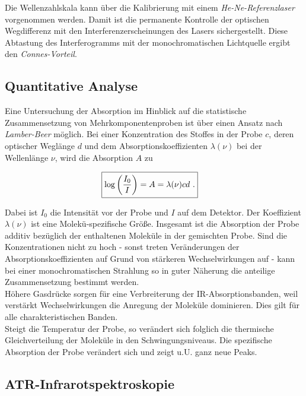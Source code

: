 \documentclass[a4paper,10pt,twocolumn]{article}
\newcommand{\ix}[1]{_\text{#1}}
\newcommand{\tilt}[1]{\textit{#1}}
\begin{document}
		Die Wellenzahlskala kann \"uber die Kalibrierung mit einem \tilt{He-Ne-Referenzlaser} vorgenommen werden. Damit ist die permanente Kontrolle der optischen Wegdifferenz mit den Interferenzerscheinungen des Lasers sichergestellt. Diese Abtastung des Interferogramms mit der monochromatischen Lichtquelle ergibt den \tilt{Connes-Vorteil}.
		
		\subsection{Quantitative Analyse}
		
		Eine Untersuchung der Absorption im Hinblick auf die statistische Zusammensetzung von Mehrkomponentenproben ist \"uber einen Ansatz nach \tilt{Lamber-Beer} m\"oglich. Bei einer Konzentration des Stoffes in der Probe $c$, deren optischer Wegl\"ange $d$ und dem Absorptionskoeffizienten $\lambda(\nu)$ bei der Wellenl\"ange $\nu$, wird die Absorption $A$ zu
		
		\begin{align}
		\Aboxed{
			\log\left(\frac{I\ix{0}}{I}\right)=A=\lambda(\nu)cd\,\, .
		}
		\label{eq:lamber}
		\end{align}
		
		
		Dabei ist $I\ix{0}$ die Intensit\"at vor der Probe und $I$ auf dem Detektor. Der Koeffizient $\lambda(\nu)$ ist eine Molek\"u-spezifische Gr\"o{\ss}e. Insgesamt ist die Absorption der Probe additiv bez\"uglich der enthaltenen Molek\"ule in der gemischten Probe. Sind die Konzentrationen nicht zu hoch - sonst treten Ver\"anderungen der Absorptionskoeffizienten auf Grund von st\"arkeren Wechselwirkungen auf - kann bei einer monochromatischen Strahlung so in guter N\"aherung die anteilige Zusammensetzung bestimmt werden.\\
		H\"ohere Gasdr\"ucke sorgen f\"ur eine Verbreiterung der IR-Absorptionsbanden, weil verst\"arkt Wechselwirkungen die Anregung der Molek\"ule dominieren. Dies gilt f\"ur alle charakteristischen Banden.\\
		Steigt die Temperatur der Probe, so ver\"andert sich folglich die thermische Gleichverteilung der Molek\"ule in den Schwingungsniveaus. Die spezifische Absorption der Probe ver\"andert sich und zeigt u.U. ganz neue Peaks. 
		
	\subsection{ATR-Infrarotspektroskopie}
		
\end{document}
